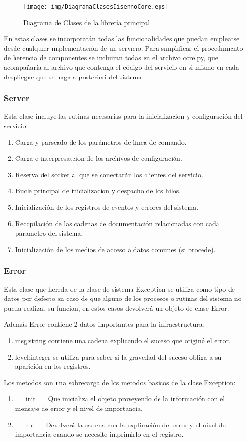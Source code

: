 \documentclass[a4paper,spanish,12pt]{book}
\begin{document}
\begin{figure}[h]
	\texttt{[image: img/DiagramaClasesDisennoCore.eps]}
	\caption{Diagrama de Clases de la librería principal} 
	      \label{fig:DiagramaClasesDiseñoCore}
\end{figure}

En estas clases se incorporarán todas las funcionalidades que puedan emplearse desde cualquier implementación de un servicio. Para simplificar el procedimiento de herencia de componentes se incluiran todas en el archivo core.py, que acompañaría al archivo que contenga el código del servicio en si mismo en cada despliegue que se haga a posteriori del sistema.
\subsubsection{Server}
Esta clase incluye las rutinas necesarias para la inicializacion y configuración del servicio:
\begin{enumerate}
	\item Carga y parseado de los parámetros de linea de comando.
	\item Carga e interpresatcion de los archivos de configuración.
	\item Reserva del socket al que se conectarán los clientes del servicio.
	\item Bucle principal de inicializacion y despacho de los hilos.	
	\item Inicialización de los registros de eventos y errores del sistema.
	\item Recopilación de las cadenas de documentación relacionadas con cada parametro del sistema.
	\item Inicialización de los medios de acceso a datos comunes (si procede). 
\end{enumerate}
\subsubsection{Error}
Esta clase que hereda de la clase de sistema Exception se utiliza como tipo de datos por defecto en caso de que alguno de los procesos o rutinas del sistema no pueda realizar su función, en estos casos devolverá un objeto de clase Error.

Además Error contiene 2 datos importantes para la infraestructura:
\begin{enumerate}
	\item msg:string contiene una cadena explicando el suceso que originó el error.
	\item level:integer se utiliza para saber si la gravedad del suceso obliga a su aparición en los registros.
\end{enumerate}
Los metodos son una sobrecarga de los metodos basicos de la clase Exception:
\begin{enumerate}
	\item \_\_init\_\_ Que inicializa el objeto proveyendo de la información con el mensaje de error y el nivel de importancia.
	\item \_\_str\_\_ Devolverá la cadena con la explicación del error y el nivel de importancia cuando se necesite imprimirlo en el registro.
\end{enumerate}
\end{document}
